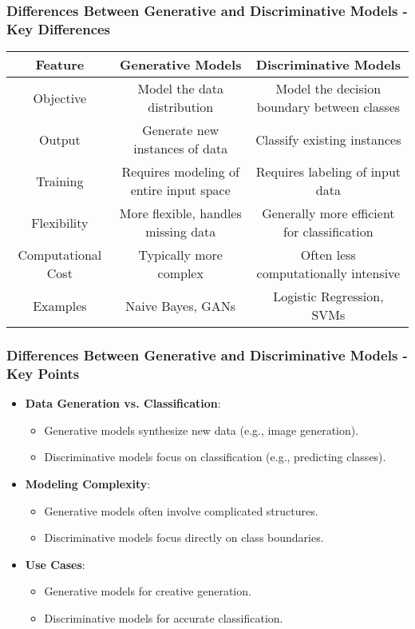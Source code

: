 \documentclass[aspectratio=169]{beamer}
\begin{document}
\begin{frame}[fragile]
  \frametitle{Differences Between Generative and Discriminative Models - Key Differences}
  
  \begin{table}[ht]
    \centering
    \begin{tabular}{|c|c|c|}
      \hline
      \textbf{Feature} & \textbf{Generative Models} & \textbf{Discriminative Models} \\
      \hline
      Objective & Model the data distribution & Model the decision boundary between classes \\
      \hline
      Output & Generate new instances of data & Classify existing instances \\
      \hline
      Training & Requires modeling of entire input space & Requires labeling of input data \\
      \hline
      Flexibility & More flexible, handles missing data & Generally more efficient for classification \\
      \hline
      Computational Cost & Typically more complex & Often less computationally intensive \\
      \hline
      Examples & Naive Bayes, GANs & Logistic Regression, SVMs \\
      \hline
    \end{tabular}
  \end{table}
\end{frame}

\begin{frame}[fragile]
  \frametitle{Differences Between Generative and Discriminative Models - Key Points}
  
  \begin{itemize}
    \item \textbf{Data Generation vs. Classification}: 
    \begin{itemize}
      \item Generative models synthesize new data (e.g., image generation).
      \item Discriminative models focus on classification (e.g., predicting classes).
    \end{itemize}
    
    \item \textbf{Modeling Complexity}:
    \begin{itemize}
      \item Generative models often involve complicated structures.
      \item Discriminative models focus directly on class boundaries.
    \end{itemize}

    \item \textbf{Use Cases}:
    \begin{itemize}
      \item Generative models for creative generation.
      \item Discriminative models for accurate classification.
    \end{itemize}
  \end{itemize}
\end{frame}
\end{document}
